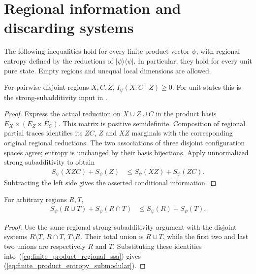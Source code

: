 \section{Regional information and discarding systems}

The following inequalities hold for every finite-product vector $\psi$,
with regional entropy defined by the reductions of
$|\psi\rangle\langle\psi|$. In particular, they hold for every unit pure
state. Empty regions and unequal local dimensions are allowed.

\begin{theorem}
    \label{thm:finite_product_conditional_nonnegative}
    \leanok
    For pairwise disjoint regions $X,C,Z$,
    $I_\psi(X:C\mid Z)\ge0$.
    For unit states this is the strong-subadditivity input in
    \cite[Section~2]{OpenAI2026AreaLaw}.
\end{theorem}
\begin{proof}\leanok
    Express the actual reduction on $X\cup Z\cup C$ in the product basis
    $E_X\times(E_Z\times E_C)$. This matrix is positive semidefinite.
    Composition of regional partial traces identifies its $ZC$, $Z$ and
    $XZ$ marginals with the corresponding original regional reductions.
    The two associations of three disjoint configuration spaces agree;
    entropy is unchanged by their basis bijections. Apply unnormalized
    strong subadditivity to obtain
    \begin{align}
        S_\psi(XZC)+S_\psi(Z)&\le S_\psi(XZ)+S_\psi(ZC).
        \label{eq:finite_product_regional_ssa}
    \end{align}
    Subtracting the left side gives the asserted conditional information.
\end{proof}

\begin{theorem}
    \label{thm:finite_product_entropy_submodular}
    \leanok
    For arbitrary regions $R,T$,
    \begin{align}
        S_\psi(R\cup T)+S_\psi(R\cap T)&\le S_\psi(R)+S_\psi(T).
        \label{eq:finite_product_entropy_submodular}
    \end{align}
\end{theorem}
\begin{proof}\leanok
    Use the same regional strong-subadditivity argument with the disjoint
    systems $R\setminus T$, $R\cap T$, $T\setminus R$.
    Their total union is $R\cup T$, while the first two and last two
    unions are respectively $R$ and $T$. Substituting these identities
    into~(\ref{eq:finite_product_regional_ssa}) gives
    (\ref{eq:finite_product_entropy_submodular}).
\end{proof}

